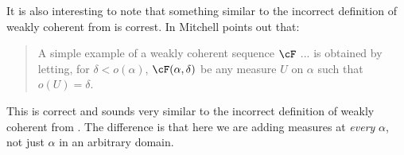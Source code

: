 \documentclass[oneside,12pt]{amsart}
\begin{document}
It is also interesting to note that something similar to the incorrect definition of weakly coherent
from \cite{BeginningInnerModelTheory} is correst. In \cite{Mitchell-Revisited} Mitchell points out
that:

\begin{quote}
A simple example of a weakly coherent sequence $\cF$ ... is obtained by letting, for $\delta<o(\alpha)$,
$\cF(\alpha,\delta)$ be any measure $U$ on $\alpha$ such that $o(U) = \delta$.
\end{quote}

This is correct and sounds very similar to the incorrect definition of weakly coherent from
\cite{BeginningInnerModelTheory}. The difference is that here we are adding measures at \emph{every}
$\alpha$, not just $\alpha$ in an arbitrary domain.






\end{document}
